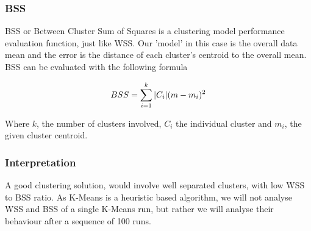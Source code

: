 \documentclass[11pt]{article}
\begin{document}
				\subsubsection*{BSS}
				BSS or  Between Cluster Sum of Squares is a clustering model performance evaluation function, just like WSS. Our 'model' in this case is the overall data mean and the error is the distance of each cluster's centroid to the overall mean. BSS can be evaluated with the following formula\cite{???}
				\iftrue
				\begin{align}
					BSS = \sum_{i=1}^{k}{\abs{C_i}(m-m_i)^2}	
				\end{align}
				\fi
				Where $k$, the number of clusters involved, $C_i$ the individual cluster and $m_i$, the given cluster centroid.
			\subsubsection*{Interpretation}
				A good clustering solution, would involve well separated clusters, with low WSS to BSS ratio\cite{???}. As K-Means is a heuristic based algorithm, we will not analyse WSS and BSS of a single K-Means run, but rather we will analyse their behaviour after a sequence of 100 runs. 
				\iftrue
\end{document}
